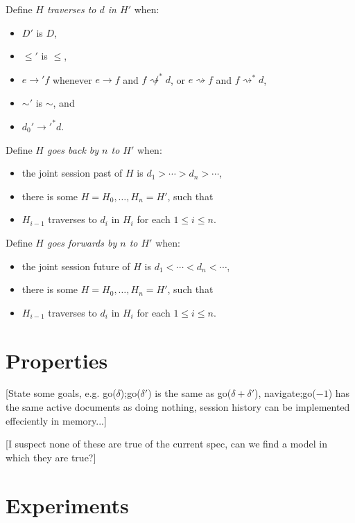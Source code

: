 \documentclass{article}
\newcommand{\aNH}{H}
\newcommand{\Docs}{D}
\newcommand{\parentOf}{\rightarrow}
\newcommand{\leChron}{\le}
\newcommand{\ltChron}{<}
\newcommand{\gtChron}{>}
\newcommand{\eqSess}{\sim}
\newcommand{\parentOfSess}{\rightsquigarrow}
\newcommand{\rootDoc}{d_0}
\newcommand{\aDoc}{d}
\newcommand{\bDoc}{e}
\newcommand{\cDoc}{f}
\begin{document}
Define \emph{$\aNH$ traverses to $\aDoc$ in $\aNH'$} when:
\begin{itemize}
\item $\Docs'$ is $\Docs$,
\item $\leChron'$ is $\leChron$,
\item $\bDoc \parentOf' \cDoc$ whenever
  $\bDoc \parentOf \cDoc$ and $\cDoc \not\parentOfSess^* \aDoc$, or
  $\bDoc \parentOfSess \cDoc$ and $\cDoc \parentOfSess^* \aDoc$, 
\item $\eqSess'$ is $\eqSess$, and
\item $\rootDoc' \parentOf'^* \aDoc$.
\end{itemize}
Define \emph{$\aNH$ goes back by $n$ to $\aNH'$} when:
\begin{itemize}
\item the joint session past of $\aNH$ is $\aDoc_1 \gtChron \cdots \gtChron \aDoc_n \gtChron \cdots$,
\item there is some $\aNH=\aNH_0,\ldots,\aNH_n=\aNH'$, such that
\item $H_{i-1}$ traverses to $d_i$ in $H_i$ for each $1 \le i \le n$.
\end{itemize}
Define \emph{$\aNH$ goes forwards by $n$ to $\aNH'$} when:
\begin{itemize}
\item the joint session future of $\aNH$ is $\aDoc_1 \ltChron \cdots \ltChron \aDoc_n \ltChron \cdots$,
\item there is some $\aNH=\aNH_0,\ldots,\aNH_n=\aNH'$, such that
\item $H_{i-1}$ traverses to $d_i$ in $H_i$ for each $1 \le i \le n$.
\end{itemize}

\section{Properties}

[State some goals, e.g. go($\delta$);go($\delta'$) is the same as go($\delta+\delta'$),
  navigate;go($-1$) has the same active documents as doing nothing,
  session history can be implemented effeciently in memory...]

[I suspect none of these are true of the current spec, can we find a model in which
  they are true?]
  
\section{Experiments}
\end{document}
